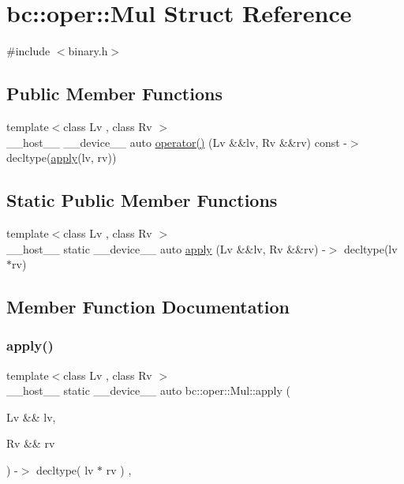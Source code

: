 \hypertarget{structbc_1_1oper_1_1Mul}{}\section{bc\+:\+:oper\+:\+:Mul Struct Reference}
\label{structbc_1_1oper_1_1Mul}


{\ttfamily \#include $<$binary.\+h$>$}

\subsection*{Public Member Functions}
\begin{DoxyCompactItemize}
\item 
{\footnotesize template$<$class Lv , class Rv $>$ }\\\+\_\+\+\_\+host\+\_\+\+\_\+ \+\_\+\+\_\+device\+\_\+\+\_\+ auto \hyperlink{structbc_1_1oper_1_1Mul_a3d575d27e79a8ae6e3628c2c6853fec0}{operator()} (Lv \&\&lv, Rv \&\&rv) const -\/$>$ decltype(\hyperlink{structbc_1_1oper_1_1Mul_a92227363c70d4c198263cb4d8a3c063c}{apply}(lv, rv))
\end{DoxyCompactItemize}
\subsection*{Static Public Member Functions}
\begin{DoxyCompactItemize}
\item 
{\footnotesize template$<$class Lv , class Rv $>$ }\\\+\_\+\+\_\+host\+\_\+\+\_\+ static \+\_\+\+\_\+device\+\_\+\+\_\+ auto \hyperlink{structbc_1_1oper_1_1Mul_a92227363c70d4c198263cb4d8a3c063c}{apply} (Lv \&\&lv, Rv \&\&rv) -\/$>$ decltype(lv $\ast$rv)
\end{DoxyCompactItemize}


\subsection{Member Function Documentation}
\mbox{\label{structbc_1_1oper_1_1Mul_a92227363c70d4c198263cb4d8a3c063c}} 
\subsubsection{\texorpdfstring{apply()}{apply()}}
{\footnotesize\ttfamily template$<$class Lv , class Rv $>$ \\
\+\_\+\+\_\+host\+\_\+\+\_\+ static \+\_\+\+\_\+device\+\_\+\+\_\+ auto bc\+::oper\+::\+Mul\+::apply (\begin{DoxyParamCaption}\item[{Lv \&\&}]{lv,  }\item[{Rv \&\&}]{rv }\end{DoxyParamCaption}) -\/$>$ decltype( lv $\ast$ rv ) \hspace{0.3cm}{\ttfamily [inline]}, {\ttfamily [static]}}

